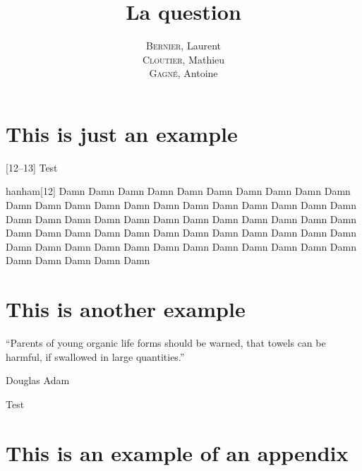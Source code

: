 \documentclass[12pt]{GDD}
\author{%
    \textsc{Bernier}, Laurent \\%
    \textsc{Cloutier}, Mathieu \\%
    \textsc{Gagné}, Antoine%
}
\title{La question}
\begin{document}
\chapter{This is just an example}
\lipsum%
[12--13]
Test

\begin{quoting}{hanham}[12]
    Damn Damn Damn Damn Damn Damn Damn Damn Damn Damn Damn Damn Damn Damn Damn Damn Damn Damn Damn Damn Damn Damn Damn Damn Damn Damn Damn Damn Damn Damn Damn Damn Damn Damn Damn Damn Damn Damn Damn Damn Damn Damn Damn Damn Damn Damn Damn Damn Damn Damn Damn Damn Damn Damn Damn Damn Damn Damn Damn Damn Damn Damn Damn
\end{quoting}


\chapter{This is another example}
\epigraph{``Parents of young organic life forms should be warned, that towels can be harmful, if swallowed in large quantities.''}{Douglas Adam}
\lipsum%
Test

\printbibliography[heading=bibintoc]%

\appendix

\chapter{This is an example of an appendix}
\lipsum%
\end{document}
